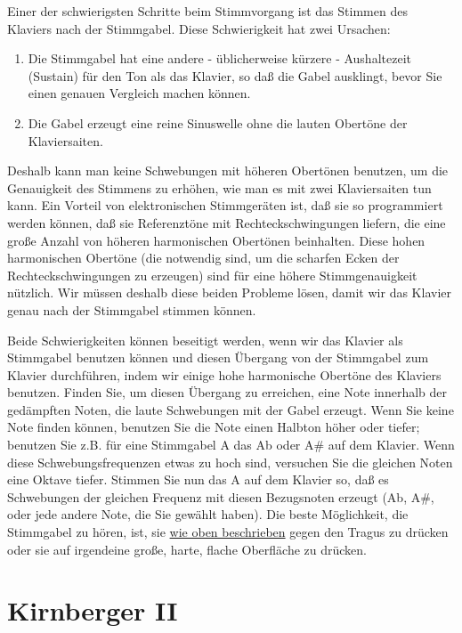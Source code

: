 Einer der schwierigsten Schritte beim Stimmvorgang ist das Stimmen des Klaviers nach der Stimmgabel.
Diese Schwierigkeit hat zwei Ursachen:

\begin{enumerate}[label={\arabic*.}] 
 \item Die Stimmgabel hat eine andere - üblicherweise kürzere - Aushaltezeit (Sustain) für den Ton als das
 Klavier, so daß die Gabel ausklingt, bevor Sie einen genauen Vergleich machen können.
 \item Die Gabel erzeugt eine reine Sinuswelle ohne die lauten Obertöne der Klaviersaiten.
\end{enumerate}

Deshalb kann man keine Schwebungen mit höheren Obertönen benutzen, um die Genauigkeit des Stimmens zu erhöhen, wie man es mit zwei Klaviersaiten tun kann.
Ein Vorteil von elektronischen Stimmgeräten ist, daß sie so programmiert werden können, daß sie Referenztöne mit Rechteckschwingungen liefern, die eine große Anzahl von höheren harmonischen Obertönen beinhalten.
Diese hohen harmonischen Obertöne (die notwendig sind, um die scharfen Ecken der Rechteckschwingungen zu erzeugen) sind für eine höhere Stimmgenauigkeit nützlich.
Wir müssen deshalb diese beiden Probleme lösen, damit wir das Klavier genau nach der Stimmgabel stimmen können.

Beide Schwierigkeiten können beseitigt werden, wenn wir das Klavier als Stimmgabel benutzen können und diesen Übergang von der Stimmgabel zum Klavier durchführen, indem wir einige hohe harmonische Obertöne des Klaviers benutzen.
Finden Sie, um diesen Übergang zu erreichen, eine Note innerhalb der gedämpften Noten, die laute Schwebungen mit der Gabel erzeugt.
Wenn Sie keine Note finden können, benutzen Sie die Note einen Halbton höher oder tiefer; benutzen Sie z.B. für eine Stimmgabel A das Ab oder A\# auf dem Klavier.
Wenn diese Schwebungsfrequenzen etwas zu hoch sind, versuchen Sie die gleichen Noten eine Oktave tiefer.
Stimmen Sie nun das A auf dem Klavier so, daß es Schwebungen der gleichen Frequenz mit diesen Bezugsnoten erzeugt (Ab, A\#, oder jede andere Note, die Sie gewählt haben).
Die beste Möglichkeit, die Stimmgabel zu hören, ist, sie \hyperref[c2_3_gabel]{wie oben beschrieben} gegen den Tragus zu drücken oder sie auf irgendeine große, harte, flache Oberfläche zu drücken.
 

\hypertarget{c2_6c}{}
\section{Kirnberger II}
\label{c2_6_kirn}

